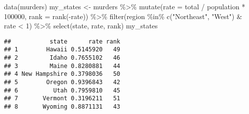 \documentclass[
]{article}
\newenvironment{Shaded}{\begin{snugshade}}{\end{snugshade}}
\newcommand{\AttributeTok}[1]{\textcolor[rgb]{0.77,0.63,0.00}{#1}}
\newcommand{\DecValTok}[1]{\textcolor[rgb]{0.00,0.00,0.81}{#1}}
\newcommand{\FunctionTok}[1]{\textcolor[rgb]{0.00,0.00,0.00}{#1}}
\newcommand{\NormalTok}[1]{#1}
\newcommand{\OtherTok}[1]{\textcolor[rgb]{0.56,0.35,0.01}{#1}}
\newcommand{\SpecialCharTok}[1]{\textcolor[rgb]{0.00,0.00,0.00}{#1}}
\newcommand{\StringTok}[1]{\textcolor[rgb]{0.31,0.60,0.02}{#1}}
\begin{document}
\begin{Shaded}
\begin{Highlighting}[]
\FunctionTok{data}\NormalTok{(murders)}
\NormalTok{my\_states }\OtherTok{\textless{}{-}}\NormalTok{ murders }\SpecialCharTok{\%\textgreater{}\%} \FunctionTok{mutate}\NormalTok{(}\AttributeTok{rate =}\NormalTok{ total }\SpecialCharTok{/}\NormalTok{ population }\SpecialCharTok{*} \DecValTok{100000}\NormalTok{, }\AttributeTok{rank =} \FunctionTok{rank}\NormalTok{(}\SpecialCharTok{{-}}\NormalTok{rate)) }\SpecialCharTok{\%\textgreater{}\%} \FunctionTok{filter}\NormalTok{(region }\SpecialCharTok{\%in\%} \FunctionTok{c}\NormalTok{(}\StringTok{"Northeast"}\NormalTok{, }\StringTok{"West"}\NormalTok{) }\SpecialCharTok{\&}\NormalTok{ rate }\SpecialCharTok{\textless{}} \DecValTok{1}\NormalTok{) }\SpecialCharTok{\%\textgreater{}\%} \FunctionTok{select}\NormalTok{(state, rate, rank)}
\NormalTok{my\_states}
\end{Highlighting}
\end{Shaded}

\begin{verbatim}
##           state      rate rank
## 1        Hawaii 0.5145920   49
## 2         Idaho 0.7655102   46
## 3         Maine 0.8280881   44
## 4 New Hampshire 0.3798036   50
## 5        Oregon 0.9396843   42
## 6          Utah 0.7959810   45
## 7       Vermont 0.3196211   51
## 8       Wyoming 0.8871131   43
\end{verbatim}
\end{document}

